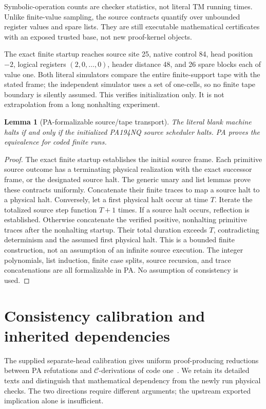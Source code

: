 \documentclass[10pt,letterpaper]{article}
\newtheorem{lemma}[theorem]{Lemma}
\newcommand{\C}{\mathcal C}
\begin{document}
Symbolic-operation counts are checker statistics, not literal TM running
times. Unlike finite-value sampling, the source contracts quantify over
unbounded register values and spare lists. They are still executable
mathematical certificates with an exposed trusted base, not new proof-kernel
objects.

The exact finite startup reaches source site 25, native control 84, head
position \(-2\), logical registers \((2,0,\ldots,0)\), header distance 48,
and 26 spare blocks each of value one. Both literal simulators compare the
entire finite-support tape with the stated frame; the independent simulator
uses a set of one-cells, so no finite tape boundary is silently assumed.
This verifies initialization only. It is not extrapolation from a long
nonhalting experiment.

\begin{lemma}[PA-formalizable source/tape transport]\label{lem:transport}
The literal blank machine halts if and only if the initialized PA194NQ
source scheduler halts. PA proves the equivalence for coded finite runs.
\end{lemma}
\begin{proof}
The exact finite startup establishes the initial source frame. Each
primitive source outcome has a terminating physical realization with the
exact successor frame, or the designated source halt. The generic unary
and list lemmas prove these contracts uniformly. Concatenate their finite
traces to map a source halt to a physical halt. Conversely, let a first
physical halt occur at time \(T\). Iterate the totalized source step function
\(T+1\) times. If a source halt occurs, reflection is established. Otherwise
concatenate the verified positive, nonhalting primitive traces after the
nonhalting startup. Their total duration exceeds \(T\), contradicting
determinism and the assumed first physical halt. This is a bounded finite
construction, not an assumption of an infinite source execution.
The integer polynomials, list induction,
finite case splits, source recursion, and trace concatenations are all
formalizable in PA. No assumption of consistency is used.
\end{proof}

\section{Consistency calibration and inherited dependencies}\label{sec:calibration}

The supplied separate-head calibration gives uniform proof-producing
reductions between PA refutations and \(\C\)-derivations of code
one~\cite{primary,nopush}.
We retain its detailed texts and distinguish that mathematical dependency
from the newly run physical checks. The two directions require different
arguments; the upstream exported implication alone is insufficient.
\end{document}
